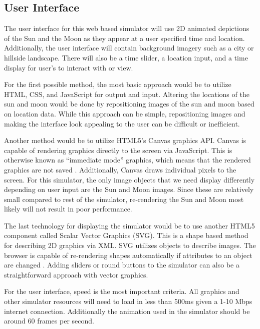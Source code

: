 \documentclass[10pt, onecolumn, draftclsnofoot, letterpaper, compsoc]{IEEEtran}
\begin{document}
\subsection{User Interface}

The user interface for this web based simulator will use 2D animated depictions
of the Sun and the Moon as they appear at a user specified time and location.
Additionally, the user interface will contain background imagery such as a
city or hillside landscape. There will also be a time slider, a location
input, and a time display for user’s to interact with or view.

For the first possible method, the most basic approach would be to utilize
HTML, CSS, and JavaScript for output and input. Altering the locations of the
sun and moon would be done by repositioning images of the sun and moon based on
location data. While this approach can be simple, repositioning images and
making the interface look appealing to the user can be difficult or
inefficient.

Another method would be to utilize HTML5’s Canvas graphics API. Canvas is
capable of rendering graphics directly to the screen via JavaScript. This is
otherwise known as “immediate mode” graphics, which means that the rendered
graphics are not saved \cite{SVGvsC}. Additionally, Canvas draws individual
pixels to the screen. For this simulator, the only image objects that we need
display differently depending on user input are the Sun and Moon images.
Since these are relatively small compared to rest of the simulator,
re-rendering the Sun and Moon most likely will not result in poor performance.

The last technology for displaying the simulator would be to use another HTML5
component called Scalar Vector Graphics (SVG). This is a shape based method
for describing 2D graphics via XML.  SVG utilizes objects to describe images.
The browser is capable of re-rendering shapes automatically if attributes to
an object are changed \cite{SVG}. Adding sliders or round buttons to the
simulator can also be a straightforward approach with vector graphics.

For the user interface, speed is the most important criteria. All graphics and
other simulator resources will need to load in less than 500ms given a 1-10
Mbps internet connection. Additionally the animation used in the simulator
should be around 60 frames per second.
\end{document}
